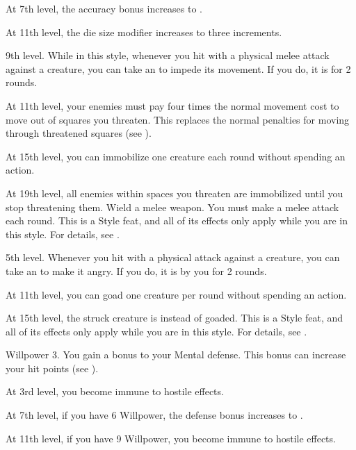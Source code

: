     At 7th level, the accuracy bonus increases to .

    At 11th level, the die size modifier increases to three increments.

    \featpre 9th level.
    \featben While in this style, whenever you hit with a physical melee attack against a creature, you can take an  to impede its movement.
    If you do, it is \immobilized for 2 rounds.

    At 11th level, your enemies must pay four times the normal movement cost to move out of squares you threaten.
    This replaces the normal penalties for moving through threatened squares (see ).

    At 15th level, you can immobilize one creature each round without spending an action.

    At 19th level, all enemies within spaces you threaten are immobilized until you stop threatening them.
    \stylereq Wield a melee weapon.
    You must make a melee attack each round.
     This is a Style feat, and all of its effects only apply while you are in this style.
    For details, see .

    \featpre 5th level.
    \featben Whenever you hit with a physical attack against a creature, you can take an  to make it angry.
    If you do, it is \goaded by you for 2 rounds.

    At 11th level, you can goad one creature per round without spending an action.

    At 15th level, the struck creature is \taunted instead of goaded.
     This is a Style feat, and all of its effects only apply while you are in this style.
    For details, see .

    \featpre Willpower 3.
    \featben You gain a  bonus to your Mental defense.
    This bonus can increase your hit points (see ).

    At 3rd level, you become immune to hostile  effects.

    At 7th level, if you have 6 Willpower, the defense bonus increases to .

    At 11th level, if you have 9 Willpower, you become immune to hostile  effects.

